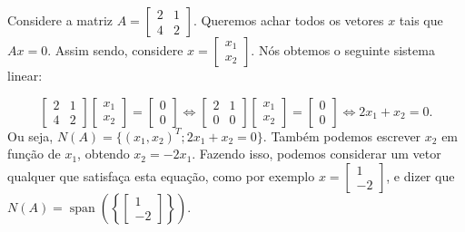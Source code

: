 \begin{Example}
	Considere a matriz $A = \begin{bmatrix}
		2 & 1 \\
		4 & 2
	\end{bmatrix}$. Queremos achar todos os vetores $x$ tais que $Ax = 0$. Assim sendo, considere $x = \begin{bmatrix}
		x_1 \\
		x_2
	\end{bmatrix}$. Nós obtemos o seguinte sistema linear:
	
	$$
	\begin{bmatrix}
		2 & 1 \\
		4 & 2
	\end{bmatrix}
	\begin{bmatrix}
		x_1 \\
		x_2
	\end{bmatrix}
	=
	\begin{bmatrix}
		0 \\
		0
	\end{bmatrix}
	\iff
	\begin{bmatrix}
		2 & 1 \\
		0 & 0
	\end{bmatrix}
	\begin{bmatrix}
		x_1 \\
		x_2
	\end{bmatrix}
	=
	\begin{bmatrix}
		0 \\
		0
	\end{bmatrix}
	\iff
	2x_1 + x_2 = 0.
	$$
	Ou seja, $N(A) = \{(x_1, x_2)^T; 2x_1 + x_2 = 0\}$. Também podemos escrever $x_2$ em função de $x_1$, obtendo $x_2 = -2x_1$. Fazendo isso, podemos considerar um vetor qualquer que satisfaça esta equação, como por exemplo $x = \begin{bmatrix}
		1 \\
		-2
	\end{bmatrix}$, e dizer que $N(A) = \operatorname{span}\left(\left\{\begin{bmatrix}
		1 \\
		-2
	\end{bmatrix}\right\}\right)$.
\end{Example}

